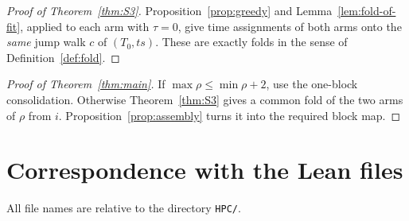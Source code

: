 \documentclass[11pt]{article}
\theoremstyle{definition}
\theoremstyle{remark}
\newcommand{\lean}[1]{\texttt{#1}}
\begin{document}
\begin{proof}[Proof of Theorem~\ref{thm:S3}]
Proposition~\ref{prop:greedy} and Lemma~\ref{lem:fold-of-fit}, applied to each
arm with $\tau=0$, give time assignments of both arms onto the \emph{same} jump
walk $c$ of $(T_0,ts)$. These are exactly folds in the sense of
Definition~\ref{def:fold}.
\end{proof}

\begin{proof}[Proof of Theorem~\ref{thm:main}]
If $\max\rho\le\min\rho+2$, use the one-block consolidation. Otherwise
Theorem~\ref{thm:S3} gives a common fold of the two arms of $\rho$ from $i$.
Proposition~\ref{prop:assembly} turns it into the required block map.
\end{proof}

\section{Correspondence with the Lean files}\label{sec:table}

All file names are relative to the directory \lean{HPC/}.
\end{document}
